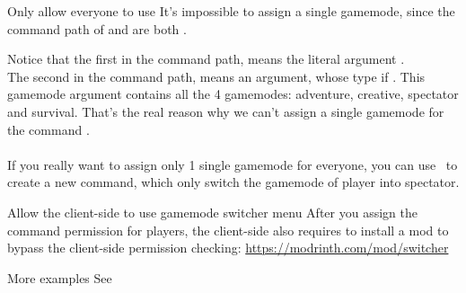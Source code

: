\begin{example}{Only allow everyone to use }
    It's impossible to assign a single gamemode, since the command path of  and  are both .

    Notice that the first  in the command path, means the literal argument .\\
    The second  in the command path, means an argument, whose type if .
    This gamemode argument contains all the 4 gamemodes: adventure, creative, spectator and survival.
    That's the real reason why we can't assign a single gamemode for the command .\\\\
    If you really want to assign only 1 single gamemode for everyone, you can use~ to create a new command, which only switch the gamemode of player into spectator.

\end{example}

\begin{tips}{Allow the client-side to use gamemode switcher menu}
    After you assign the  command permission for players, the client-side also requires to install a mod to bypass the client-side permission checking: \url{https://modrinth.com/mod/switcher}
\end{tips}

\begin{example}{More examples}
    See~
\end{example}

